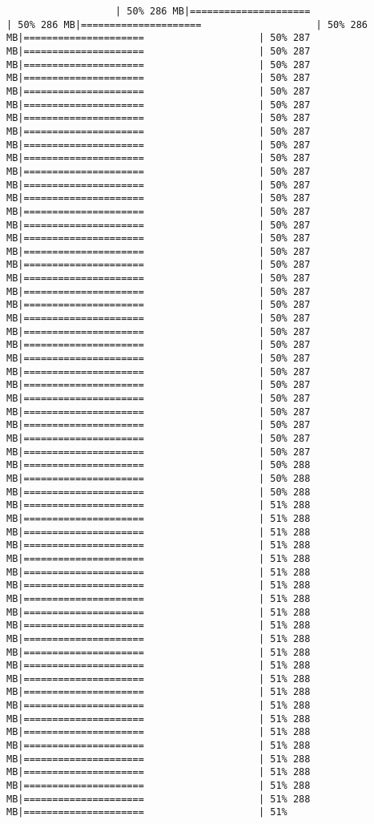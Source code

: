 \documentclass[
]{article}
\begin{document}
\begin{verbatim}
                   | 50% 286 MB|=====================                    | 50% 286 MB|=====================                    | 50% 286 MB|=====================                    | 50% 287 MB|=====================                    | 50% 287 MB|=====================                    | 50% 287 MB|=====================                    | 50% 287 MB|=====================                    | 50% 287 MB|=====================                    | 50% 287 MB|=====================                    | 50% 287 MB|=====================                    | 50% 287 MB|=====================                    | 50% 287 MB|=====================                    | 50% 287 MB|=====================                    | 50% 287 MB|=====================                    | 50% 287 MB|=====================                    | 50% 287 MB|=====================                    | 50% 287 MB|=====================                    | 50% 287 MB|=====================                    | 50% 287 MB|=====================                    | 50% 287 MB|=====================                    | 50% 287 MB|=====================                    | 50% 287 MB|=====================                    | 50% 287 MB|=====================                    | 50% 287 MB|=====================                    | 50% 287 MB|=====================                    | 50% 287 MB|=====================                    | 50% 287 MB|=====================                    | 50% 287 MB|=====================                    | 50% 287 MB|=====================                    | 50% 287 MB|=====================                    | 50% 287 MB|=====================                    | 50% 287 MB|=====================                    | 50% 287 MB|=====================                    | 50% 287 MB|=====================                    | 50% 287 MB|=====================                    | 50% 288 MB|=====================                    | 50% 288 MB|=====================                    | 50% 288 MB|=====================                    | 51% 288 MB|=====================                    | 51% 288 MB|=====================                    | 51% 288 MB|=====================                    | 51% 288 MB|=====================                    | 51% 288 MB|=====================                    | 51% 288 MB|=====================                    | 51% 288 MB|=====================                    | 51% 288 MB|=====================                    | 51% 288 MB|=====================                    | 51% 288 MB|=====================                    | 51% 288 MB|=====================                    | 51% 288 MB|=====================                    | 51% 288 MB|=====================                    | 51% 288 MB|=====================                    | 51% 288 MB|=====================                    | 51% 288 MB|=====================                    | 51% 288 MB|=====================                    | 51% 288 MB|=====================                    | 51% 288 MB|=====================                    | 51% 288 MB|=====================                    | 51% 288 MB|=====================                    | 51% 288 MB|=====================                    | 51% 288 MB|=====================                    | 51% 
\end{verbatim}
\end{document}

